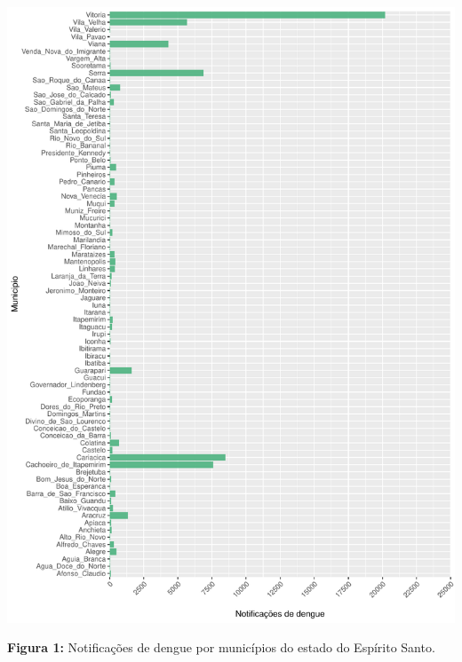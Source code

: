 \documentclass[12pt,a4paper]{article}\usepackage[]{graphicx}\usepackage[]{color}
\makeatletter
\def\maxwidth{ %
  \ifdim\Gin@nat@width>\linewidth
    \linewidth
  \else
    \Gin@nat@width
  \fi
}
\newenvironment{knitrout}{}{} %
\makeatother
\begin{document}
\begin{knitrout}
\color{fgcolor}

{\centering \includegraphics[width=\maxwidth]{figure/unnamed-chunk-3-1} 

}



\end{knitrout}
\textbf{Figura 1:} Notificações de dengue por municípios do estado do Espírito Santo.

\end{document}
